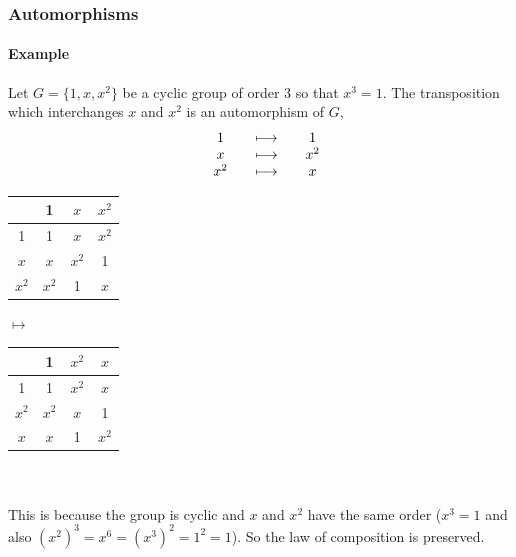 \documentclass[MathsNotesBase.tex]{subfiles}
\begin{document}
{		\bigskip
		\subsubsection{Automorphisms}
		\paragraph{Example}
		Let $G = \{1, x, x^2\}$ be a cyclic group of order 3 so that $x^3 = 1$. The transposition which interchanges $x$ and $x^2$ is an automorphism of $G$,
		\[\begin{array}{*6c}
			&1 &&\longmapsto &&1 \\
			&x &&\longmapsto &&x^2 \\
			&x^2 &&\longmapsto &&x \\
		\end{array}\]
		\begin{table}[h!]%
			\centering%
			\begin{tabular}{|c||c|c|c|}
				\hline
				      &  1    & $x$   & $x^2$ \\
				\hline
				\hline
				 1    &  1    & $x$   & $x^2$ \\
				\hline
				$x$   & $x$   & $x^2$ & 1     \\
				\hline
				$x^2$ & $x^2$ & 1     & $x$ \\
				\hline
			\end{tabular}
			$ \longmapsto $
			\begin{tabular}{|c||c|c|c|}
				\hline
				      &  1    & $x^2$ & $x$  \\
				\hline
				\hline
				1     &  1    & $x^2$  & $x$  \\
				\hline
				$x^2$ & $x^2$ & $x$   & 1    \\
				\hline
				$x$   & $x$   & 1     & $x^2$ \\
				\hline
			\end{tabular}
		\end{table}
		\\\\This is because the group is cyclic and $x$ and $x^2$ have the same order ($x^3 = 1$ and also $(x^2)^3 = x^6 = (x^3)^2 = 1^2 = 1$). So the law of composition is preserved.
		
		\bigskip
}
\end{document}
